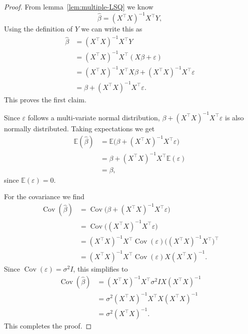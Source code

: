 \documentclass[
  a4paper,
]{article}
\theoremstyle{definition}
\theoremstyle{definition}
\theoremstyle{definition}
\theoremstyle{definition}
\theoremstyle{remark}
\begin{document}
\begin{proof}
From lemma~\ref{lem:multiple-LSQ} we know
\begin{equation*}
  \hat\beta
  = (X^\top X)^{-1} X^\top Y,
\end{equation*}
Using the definition of \(Y\) we can write this as
\begin{align*}
  \hat\beta
  &= (X^\top X)^{-1} X^\top Y \\
  &= (X^\top X)^{-1} X^\top (X\beta + \varepsilon) \\
  &= (X^\top X)^{-1} X^\top X \beta + (X^\top X)^{-1} X^\top \varepsilon\\
  &= \beta + (X^\top X)^{-1} X^\top \varepsilon.
\end{align*}
This proves the first claim.

Since \(\varepsilon\) follows a multi-variate normal distribution,
\(\beta + (X^\top X)^{-1} X^\top \varepsilon\) is also normally distributed.
Taking expectations we get
\begin{align*}
  \mathbb{E}(\hat\beta)
  &= \mathbb{E}\bigl( \beta + (X^\top X)^{-1} X^\top \varepsilon\bigr) \\
  &= \beta + (X^\top X)^{-1} X^\top \mathbb{E}(\varepsilon) \\
  &= \beta,
\end{align*}
since \(\mathbb{E}(\varepsilon) = 0\).

For the covariance we find
\begin{align*}
  \mathop{\mathrm{Cov}}(\hat\beta)
  &= \mathop{\mathrm{Cov}}\bigl( \beta + (X^\top X)^{-1} X^\top \varepsilon\bigr) \\
  &= \mathop{\mathrm{Cov}}\bigl( (X^\top X)^{-1} X^\top \varepsilon\bigr) \\
  &= (X^\top X)^{-1} X^\top \mathop{\mathrm{Cov}}(\varepsilon) \bigl( (X^\top X)^{-1} X^\top \bigr)^\top \\
  &= (X^\top X)^{-1} X^\top \mathop{\mathrm{Cov}}(\varepsilon) X (X^\top X)^{-1}.
\end{align*}
Since \(\mathop{\mathrm{Cov}}(\varepsilon) = \sigma^2 I\), this simplifies to
\begin{align*}
  \mathop{\mathrm{Cov}}(\hat\beta)
  &= (X^\top X)^{-1} X^\top \sigma^2 I X (X^\top X)^{-1} \\
  &= \sigma^2 (X^\top X)^{-1} X^\top X (X^\top X)^{-1} \\
  &= \sigma^2 (X^\top X)^{-1}.
\end{align*}
This completes the proof.
\end{proof}
\end{document}
